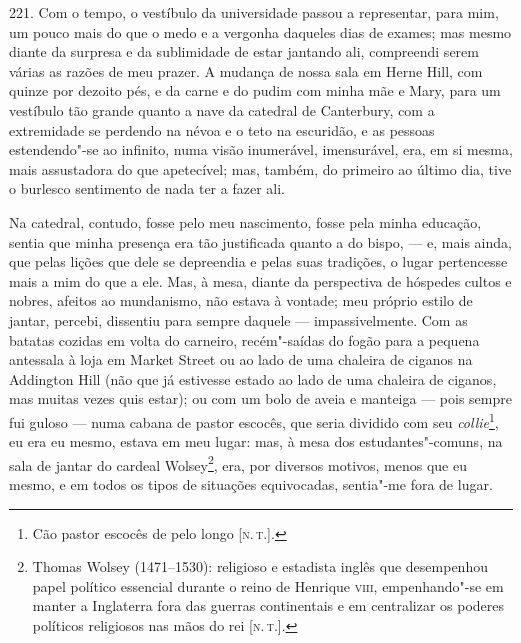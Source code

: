 221. Com o tempo, o vestíbulo da universidade passou a representar, para
mim, um pouco mais do que o medo e a vergonha daqueles dias de exames;
mas mesmo diante da surpresa e da sublimidade de estar jantando ali,
compreendi serem várias as razões de meu prazer. A mudança de nossa sala
em Herne Hill, com quinze por dezoito pés, e da carne e do pudim com
minha mãe e Mary, para um vestíbulo tão grande quanto a nave da catedral
de Canterbury, com a extremidade se perdendo na névoa e o teto na
escuridão, e as pessoas estendendo"-se ao infinito, numa visão
inumerável, imensurável, era, em si mesma, mais assustadora do que
apetecível; mas, também, do primeiro ao último dia, tive o burlesco
sentimento de nada ter a fazer ali.

Na catedral, contudo, fosse pelo meu nascimento, fosse pela minha
educação, sentia que minha presença era tão justificada quanto a do
bispo, --- e, mais ainda, que pelas lições que dele se depreendia e pelas
suas tradições, o lugar pertencesse mais a mim do que a ele. Mas, à
mesa, diante da perspectiva de hóspedes cultos e nobres, afeitos ao
mundanismo, não estava à vontade; meu próprio estilo de jantar, percebi,
dissentiu para sempre daquele --- impassivelmente. Com as batatas cozidas
em volta do carneiro, recém"-saídas do fogão para a pequena antessala à
loja em Market Street ou ao lado de uma chaleira de ciganos na Addington
Hill (não que já estivesse estado ao lado de uma chaleira de ciganos,
mas muitas vezes quis estar); ou com um bolo de aveia e manteiga --- pois
sempre fui guloso --- numa cabana de pastor escocês, que seria dividido
com seu \emph{collie}\footnote{Cão pastor escocês de pelo longo {[}\textsc{n.\,t.}{]}.}, eu era eu mesmo, estava em meu lugar: mas, à mesa dos
estudantes"-comuns, na sala de jantar do cardeal Wolsey\footnote{Thomas
  Wolsey (1471--1530): religioso e estadista inglês que desempenhou papel
  político essencial durante o reino de Henrique \textsc{viii}, empenhando"-se em
  manter a Inglaterra fora das guerras continentais e em centralizar os
  poderes políticos religiosos nas mãos do rei {[}\textsc{n.\,t.}{]}.}, era,
por diversos motivos, menos que eu mesmo, e em todos os tipos de
situações equivocadas, sentia"-me fora de lugar.

